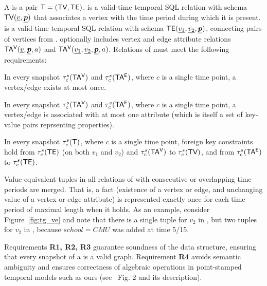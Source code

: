 \begin{definition}[TGraph]
A \tg is a pair $\mathsf{T}=(\textsf{TV}, \textsf{TE})$. \tv is a valid-time temporal SQL
relation with schema $\textsf{TV}(\underline{v}, \underline{\boldsymbol{p}})$ that
associates a vertex with the time period during which it is
present. \te is a valid-time temporal SQL relation with schema
$\textsf{TE}(\underline{v_1}, \underline{v_2}, \underline{\boldsymbol{p}})$, connecting
pairs of vertices from \tv.  
%
\tve optionally includes vertex and edge attribute relations
$\mathsf{TA^{V}}(\underline{v}, \underline{\boldsymbol{p}}, a)$ and $\mathsf{TA^{V}}(\underline{v_1},
\underline{v_2}, \underline{\boldsymbol{p}}, a)$.  
%
Relations of \tve must meet the following requirements:

\begin{description}[noitemsep]

\item [R1: Unique vertices and edges] In every snapshot $\tau^s_c
  (\mathsf{TA^{V}})$ and $\tau^s_c (\mathsf{TA^{E}})$, where $c$ is a single time point, a
  vertex/edge exists at most once.

\item [R2: Unique attribute values] In every snapshot $\tau^s_c
  (\mathsf{TA^{V}})$ and $\tau^s_c (\mathsf{TA^{E}})$, where $c$ is a single time point, a
  vertex/edge is associated with at most one attribute (which is
  itself a set of key-value pairs reprsenting properties).

\item [R3: Referential integrity] In every snapshot $\tau^s_c (\mathsf{T})$,
  where $c$ is a single time point, foreign key constraints hold from
  $\tau^s_c (\textsf{TE})$ (on both $v_1$ and $v_2$) and $\tau^s_c (\mathsf{TA^{V}})$ to
  $\tau^s_c (\textsf{TV})$, and from $\tau^s_c (\mathsf{TA^{E}})$ to $\tau^s_c (\textsf{TE})$.

\item [R4: Coalesced] Value-equivalent tuples in all relations of \tve
  with consecutive or overlapping time periods are merged.  That is, a
  fact (existence of a vertex or edge, and unchanging value of a
  vertex or edge attribute) is represented exactly once for each time
  period of maximal length when it holds. As an example, consider
  Figure~\ref{fig:tg_ve} and note that there is a single tuple for
  $v_2$ in \tv, but two tuples for $v_2$ in \tav, because $school=CMU$
  was added at time 5/15.

\end{description}
\label{def:tg}
\end{definition}

Requirements {\bf R1, R2, R3} guarantee soundness of the \tg data
structure, ensuring that every snapshot of a \tg is a valid graph.
Requirement {\bf R4} avoids semantic ambiguity and ensures correctness
of algebraic operations in point-stamped temporal models such as ours
(see~\cite{DBLP:reference/db/JensenS09k} Fig. 2 and its description).

